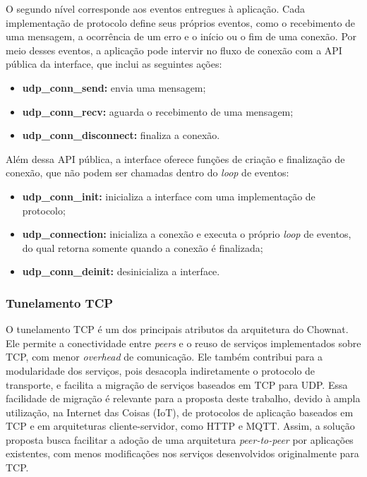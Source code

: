 O segundo nível corresponde aos eventos entregues à aplicação. Cada implementação de protocolo define seus próprios eventos, como o recebimento de uma mensagem, a ocorrência de um erro e o início ou o fim de uma conexão. Por meio desses eventos, a aplicação pode intervir no fluxo de conexão com a API pública da interface, que inclui as seguintes ações:

\begin{itemize}
    \item \textbf{udp\_conn\_send:} envia uma mensagem;
    \item \textbf{udp\_conn\_recv:} aguarda o recebimento de uma mensagem;
    \item \textbf{udp\_conn\_disconnect:} finaliza a conexão.
\end{itemize}

Além dessa API pública, a interface oferece funções de criação e finalização de conexão, que não podem ser chamadas dentro do \textit{loop} de eventos:

\begin{itemize}
    \item \textbf{udp\_conn\_init:} inicializa a interface com uma implementação de protocolo;
    \item \textbf{udp\_connection:} inicializa a conexão e executa o próprio \textit{loop} de eventos, do qual retorna somente quando a conexão é finalizada;
    \item \textbf{udp\_conn\_deinit:} desinicializa a interface.
\end{itemize}

\subsubsection{Tunelamento TCP}
\label{sec:tcp_tunneling}

O tunelamento TCP é um dos principais atributos da arquitetura do Chownat. Ele permite a conectividade entre \textit{peers} e o reuso de serviços implementados sobre TCP, com menor \textit{overhead} de comunicação. Ele também contribui para a modularidade dos serviços, pois desacopla indiretamente o protocolo de transporte, e facilita a migração de serviços baseados em TCP para UDP. Essa facilidade de migração é relevante para a proposta deste trabalho, devido à ampla utilização, na Internet das Coisas (IoT), de protocolos de aplicação baseados em TCP e em arquiteturas cliente-servidor, como HTTP e MQTT. Assim, a solução proposta busca facilitar a adoção de uma arquitetura \textit{peer-to-peer} por aplicações existentes, com menos modificações nos serviços desenvolvidos originalmente para TCP.

